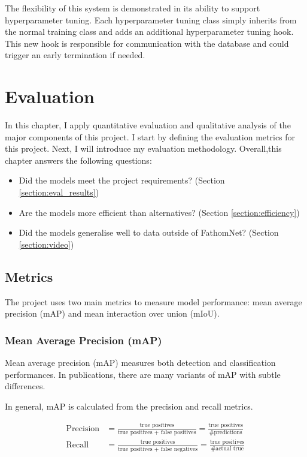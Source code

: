\documentclass[12pt,a4paper,twoside,openany]{report}
\begin{document}
The flexibility of this system is demonstrated in its ability to support hyperparameter tuning. Each hyperparameter tuning class simply inherits from the normal training class and adds an additional hyperparameter tuning hook. This new hook is responsible for communication with the database and could trigger an early termination if needed. 



\chapter{Evaluation}

In this chapter, I apply quantitative evaluation and qualitative analysis of the major components of this project. I start by defining the evaluation metrics for this project. Next, I will introduce my evaluation methodology. Overall,this chapter answers the following questions:

\begin{itemize}
    \item Did the models meet the project requirements? (Section \ref{section:eval_results})
    \item Are the models more efficient than alternatives? (Section \ref{section:efficiency})
    \item Did the models generalise well to data outside of FathomNet? (Section \ref{section:video})
\end{itemize}


\section{Metrics}
The project uses two main metrics to measure model performance: mean average precision (mAP) and mean interaction over union (mIoU). 

\subsection{Mean Average Precision (mAP)} \label{section:define_mAP}
Mean average precision (mAP) measures both detection and classification performances. In publications, there are many variants of mAP with subtle differences.

In general, mAP is calculated from the precision and recall metrics. 

\begin{align*}
    \text{Precision} &= \frac{\text{true positives}}{\text{true positives + false positives}} = \frac{\text{true positives}}{\text{\# predictions}}\\
    \text{Recall} &= \frac{\text{true positives}}{\text{true positives + false negatives}} = \frac{\text{true positives}}{\text{\# actual true}}\\
\end{align*}
\end{document}
